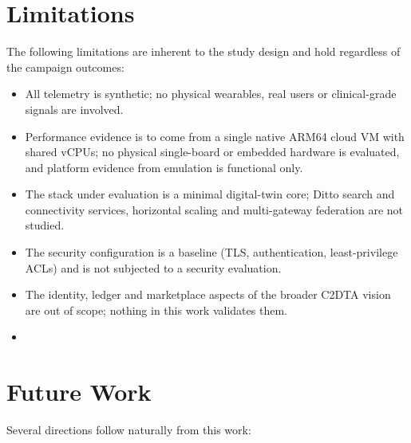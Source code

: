 \section{Limitations}
\label{sec:concl-limitations}

\noindent The following limitations are inherent to the study design and hold
regardless of the campaign outcomes:

\begin{itemize}
  \item All telemetry is synthetic; no physical wearables, real users or
        clinical-grade signals are involved.
  \item Performance evidence is to come from a single native ARM64 cloud
        \ac{VM} with shared vCPUs; no physical single-board or embedded
        hardware is evaluated, and platform evidence from emulation is
        functional only.
  \item The stack under evaluation is a minimal digital-twin core; Ditto
        search and connectivity services, horizontal scaling and
        multi-gateway federation are not studied.
  \item The security configuration is a baseline (\ac{TLS}, authentication,
        least-privilege \ac{ACL}s) and is not subjected to a security
        evaluation.
  \item The identity, ledger and marketplace aspects of the broader C2DTA
        vision are out of scope; nothing in this work validates them.
  \item {}
\end{itemize}

\section{Future Work}
\label{sec:concl-future}

\noindent Several directions follow naturally from this work:

